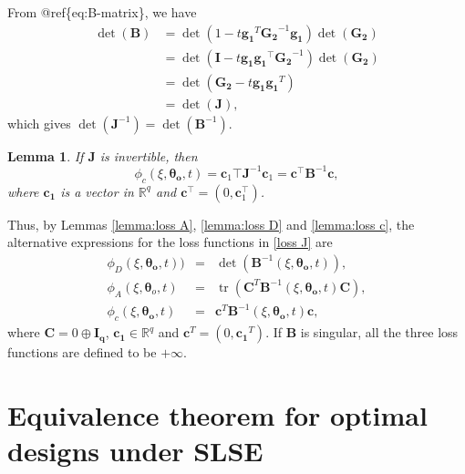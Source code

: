 \documentclass[
]{book}
\newtheorem{lemma}{Lemma}[chapter]
\theoremstyle{definition}
\theoremstyle{definition}
\theoremstyle{definition}
\theoremstyle{definition}
\theoremstyle{remark}
\begin{document}
From @ref\{eq:B-matrix\}, we have
\begin{align*}
    \det(\boldsymbol{B})    &= \det(1-t\boldsymbol{g_1}^T\boldsymbol{G_2}^{-1}\boldsymbol{g_1})\det(\boldsymbol{G_2})\\
            &= \det(\boldsymbol{I}-t\boldsymbol{g_1}\boldsymbol{g_1}^\top\boldsymbol{G_2}^{-1}) \det(\boldsymbol{G_2}) \\
            &=  \det(\boldsymbol{G_2}-t\boldsymbol{g_1}\boldsymbol{g_1}^T)\\
            &= \det(\boldsymbol{J}),
    \end{align*}
which gives \(\det(\boldsymbol{J}^{-1})=\det(\boldsymbol{B}^{-1})\).

\begin{lemma}
\protect\hypertarget{lem:loss-c}{}\label{lem:loss-c}If \(\boldsymbol{J}\) is invertible, then
\begin{equation*}
    \phi_c(\xi,\boldsymbol{\theta_o},t)=\boldsymbol{c}_1\top\boldsymbol{J}^{-1}\boldsymbol{c}_1=\boldsymbol{c}^\top\boldsymbol{B}^{-1}\boldsymbol{c},
\end{equation*}
where \(\boldsymbol{c_1}\) is a vector in \(\mathbb{R}^q\) and \(\boldsymbol{c}^\top=(0,\boldsymbol{c}_1^\top)\).
\end{lemma}

Thus, by Lemmas \ref{lemma:loss A}, \ref{lemma:loss D} and \ref{lemma:loss c}, the alternative expressions for the loss functions in \eqref{loss J} are
\begin{equation} \label{loss B}
\begin{aligned}
    \phi_D(\xi,\boldsymbol{\theta_o},t))&=&\det(\boldsymbol{B}^{-1}(\xi,\boldsymbol{\theta_o},t)),\\
    \phi_A(\xi,\boldsymbol{\theta}_o,t)&=&\operatorname{tr}(\boldsymbol{C}^T\boldsymbol{B}^{-1}(\xi,\boldsymbol{\theta_o},t)\boldsymbol{C}),\\
    \phi_c(\xi,\boldsymbol{\theta_o},t)&=&\boldsymbol{c}^T\boldsymbol{B}^{-1}(\xi,\boldsymbol{\theta_o},t)\boldsymbol{c},
\end{aligned}
\end{equation}
where \(\boldsymbol{C}= 0 \oplus \boldsymbol{I_q}\), \(\boldsymbol{c_1}\in \mathbb{R}^q\) and \(\boldsymbol{c}^T=(0,\boldsymbol{c_1}^T)\). If \(\boldsymbol{B}\) is singular, all the three loss functions are defined to be \(+\infty\).

\section{Equivalence theorem for optimal designs under SLSE}\label{equivalence-theorem-for-optimal-designs-under-slse}
\end{document}
